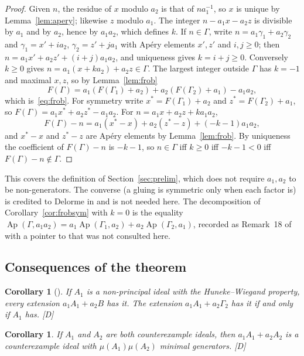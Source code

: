 \documentclass[11pt]{article}
\newtheorem{corollary}[theorem]{Corollary}
\theoremstyle{definition}
\theoremstyle{remark}
\newcommand{\Ap}{\operatorname{Ap}}
\newcommand{\mD}{\emph{[D]}}
\begin{document}
\begin{proof}
Given $n$, the residue of $x$ modulo $a_2$ is that of $n a_1^{-1}$, so $x$ is unique by Lemma~\ref{lem:apery}; likewise $z$ modulo $a_1$.
The integer $n-a_1x-a_2z$ is divisible by $a_1$ and by $a_2$, hence by $a_1a_2$, which defines $k$. If $n\in\Gamma$,
write $n=a_1\gamma_1+a_2\gamma_2$ and $\gamma_1=x'+ia_2$, $\gamma_2=z'+ja_1$ with Ap\'ery elements $x',z'$ and $i,j\ge0$; then
$n=a_1x'+a_2z'+(i+j)a_1a_2$, and uniqueness gives $k=i+j\ge0$. Conversely $k\ge0$ gives $n=a_1(x+ka_2)+a_2z\in\Gamma$.
The largest integer outside $\Gamma$ has $k=-1$ and maximal $x,z$, so by Lemma~\ref{lem:frob}
\[
F(\Gamma)=a_1(F(\Gamma_1)+a_2)+a_2(F(\Gamma_2)+a_1)-a_1a_2,
\]
which is~\eqref{eq:frob}. For symmetry write $x^*=F(\Gamma_1)+a_2$ and $z^*=F(\Gamma_2)+a_1$, so $F(\Gamma)=a_1x^*+a_2z^*-a_1a_2$. For $n=a_1x+a_2z+ka_1a_2$,
\[
F(\Gamma)-n=a_1(x^*-x)+a_2(z^*-z)+(-k-1)a_1a_2,
\]
and $x^*-x$ and $z^*-z$ are Ap\'ery elements by Lemma~\ref{lem:frob}. By uniqueness the coefficient of $F(\Gamma)-n$ is $-k-1$,
so $n\in\Gamma$ iff $k\ge0$ iff $-k-1<0$ iff $F(\Gamma)-n\notin\Gamma$.
\end{proof}

This covers the definition of Section~\ref{sec:prelim}, which does not require $a_1,a_2$ to be non-generators. The converse (a
gluing is symmetric only when each factor is) is credited to Delorme in \cite{GarciaSanchezLeamer2013} and is not needed here.
The decomposition of Corollary~\ref{cor:frobsym} with $k=0$ is the equality $\Ap(\Gamma,a_1a_2)=a_1\Ap(\Gamma_1,a_2)+a_2\Ap(\Gamma_2,a_1)$,
recorded as Remark~18 of \cite{GarciaSanchezLeamer2013} with a pointer to \cite{RosalesGarciaSanchez2009} that was not consulted here.

\subsection{Consequences of the theorem}

\begin{corollary}[{\cite[Propositions 9 and 10]{GarciaSanchezLeamer2013}}]
If $A_1$ is a non-principal ideal with the Huneke--Wiegand property, every extension $a_1A_1+a_2B$ has
it. The extension $a_1A_1+a_2\Gamma_2$ has it if and only if $A_1$ has. \mD{}
\end{corollary}

\begin{corollary}\label{cor:open}
If $A_1$ and $A_2$ are both counterexample ideals, then $a_1A_1+a_2A_2$ is a counterexample ideal with
$\mu(A_1)\mu(A_2)$ minimal generators. \mD{}
\end{corollary}
\end{document}
